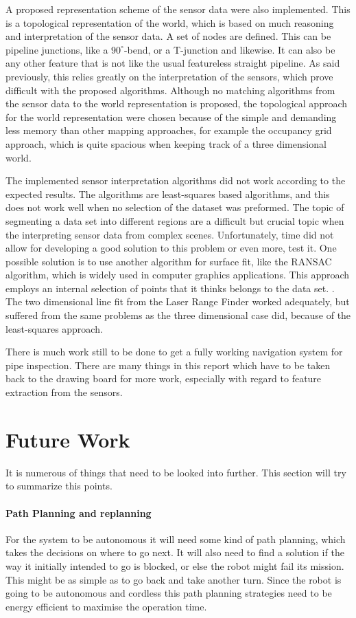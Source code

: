 A proposed representation scheme of the sensor data were also implemented. This is a
topological representation of the world, which is based on much reasoning and
interpretation of the sensor data. A set of nodes are defined. This can be pipeline
junctions, like a $90^\circ$-bend, or a T-junction and likewise. It can also be any other
feature that is not like the usual featureless straight pipeline. As said previously, this relies
greatly on the interpretation of the sensors, which prove difficult with the proposed
algorithms. Although no matching algorithms from the sensor data to the world
representation is proposed, the topological approach for the world representation were
chosen because of the simple and demanding less memory than other mapping approaches, for
example the occupancy grid approach, which is quite spacious when keeping track of a three
dimensional world. 

The implemented sensor interpretation algorithms did not work according to the expected
results. The algorithms are least-squares based algorithms, and this does not work well when
no selection of the dataset was preformed. The topic of segmenting a data set into
different regions are a difficult but crucial topic when the interpreting sensor data from
complex scenes. Unfortunately, time did not allow for developing a good solution to this
problem or even more, test it. One possible solution is to use another algorithm for surface fit, like the
RANSAC algorithm, which is widely used in computer graphics applications. This approach
employs an internal selection of points that it thinks belongs to the data set.
\cite{ransac}. The two dimensional line fit from the Laser Range Finder worked adequately,
but suffered from the same problems as the three dimensional case did, because of the
least-squares approach. 

There is much work still to be done to get a fully working navigation system for pipe
inspection. There are many things in this report which have to be taken back to the
drawing board for more work, especially with regard to feature extraction from the
sensors. 

\section{Future Work}
It is numerous of things that need to be looked into further. This section will try to 
summarize this points. 

\paragraph{Path Planning and replanning} For the system to be autonomous it will
need some kind of path planning, which takes the decisions on where to go next. It will
also need to find a solution if the way it initially intended to go is blocked, or else the
robot might fail its mission. This might be as simple as to go back and take
another turn. Since the robot is going to be autonomous and cordless this path planning
strategies need to be energy efficient to maximise the operation time. 

